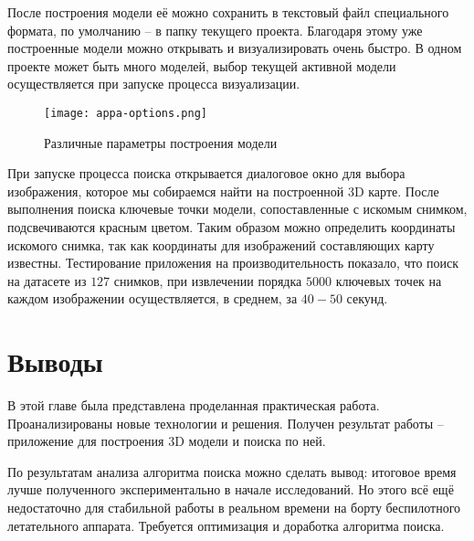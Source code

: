 После построения модели её можно сохранить в текстовый файл специального формата, по умолчанию -- в папку текущего проекта. Благодаря этому уже построенные модели можно открывать и визуализировать очень быстро. В одном проекте может быть много моделей, выбор текущей активной модели осуществляется при запуске процесса визуализации.

\begin{figure}[h]
    \centering
    \texttt{[image: appa-options.png]}
    \caption{Различные параметры построения модели}
    \label{fig:appa-options}
\end{figure}

При запуске процесса поиска открывается диалоговое окно для выбора изображения, которое мы собираемся найти на построенной 3D карте. После выполнения поиска ключевые точки модели, сопоставленные с искомым снимком, подсвечиваются красным цветом. Таким образом можно определить координаты искомого снимка, так как координаты для изображений составляющих карту известны. Тестирование приложения на производительность показало, что поиск на датасете из $127$ снимков, при извлечении порядка $5000$ ключевых точек на каждом изображении осуществляется, в среднем, за $40-50$ секунд.

\section{Выводы}

В этой главе была представлена проделанная практическая работа. Проанализированы новые технологии и решения. Получен результат работы -- приложение для построения 3D модели и поиска по ней.

По результатам анализа алгоритма поиска можно сделать вывод: итоговое время лучше полученного экспериментально в начале исследований. Но этого всё ещё недостаточно для стабильной работы в реальном времени на борту беспилотного летательного аппарата. Требуется оптимизация и доработка алгоритма поиска.

